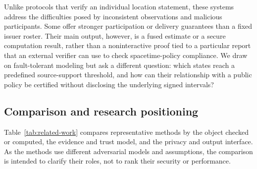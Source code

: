 Unlike protocols that verify an individual location statement, these systems address the difficulties posed by inconsistent observations and malicious participants. Some offer stronger participation or delivery guarantees than a fixed issuer roster. Their main output, however, is a fused estimate or a secure computation result, rather than a noninteractive proof tied to a particular report that an external verifier can use to check spacetime-policy compliance. We draw on fault-tolerant modeling but ask a different question: which states reach a predefined source-support threshold, and how can their relationship with a public policy be certified without disclosing the underlying signed intervals?

\subsection{Comparison and research positioning}
Table~\ref{tab:related-work} compares representative methods by the object checked or computed, the evidence and trust model, and the privacy and output interface. As the methods use different adversarial models and assumptions, the comparison is intended to clarify their roles, not to rank their security or performance.

